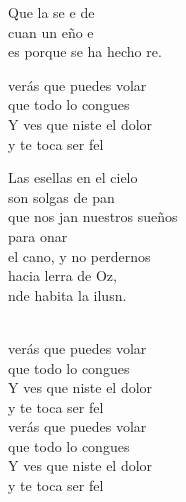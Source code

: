 \begin{cancion}
	Que la  se e de \\
	cuan un eño e\\
	es porque se ha hecho re.\jump\\
	\begin{chorus}%
		verás que puedes volar\\
		que todo lo congues\\
		Y ves que niste el dolor \\
		y te toca ser fel\jump\\
	\end{chorus}%
	Las esellas en el cielo\\
	son solgas de pan\\
	que nos jan nuestros sueños\\
	para onar\\
	el cano, y no perdernos\\
	hacia lerra de Oz,\\
	nde habita la ilusn. \\
	\jumjump\\
	\begin{chorus}%
		verás que puedes volar\\
		que todo lo congues\\
		Y ves que niste el dolor \\
		y te toca ser fel\chord{Mi}{}{iz}\\
	\jump
		verás que puedes volar\\
		que todo lo congues\\
		Y ves que niste el dolor \\
		y te toca ser fel\jump\\
	\end{chorus}%
\end{cancion}%

